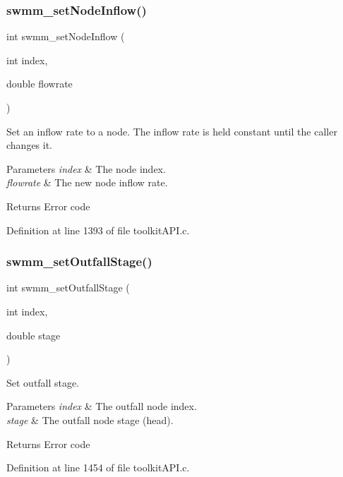\subsubsection{\texorpdfstring{swmm\+\_\+set\+Node\+Inflow()}{swmm\_setNodeInflow()}}
{\footnotesize\ttfamily int swmm\+\_\+set\+Node\+Inflow (\begin{DoxyParamCaption}\item[{int}]{index,  }\item[{double}]{flowrate }\end{DoxyParamCaption})}



Set an inflow rate to a node. The inflow rate is held constant until the caller changes it. 


\begin{DoxyParams}{Parameters}
{\em index} & The node index. \\
\hline
{\em flowrate} & The new node inflow rate. \\
\hline
\end{DoxyParams}
\begin{DoxyReturn}{Returns}
Error code 
\end{DoxyReturn}


Definition at line 1393 of file toolkit\+A\+P\+I.\+c.

\mbox{\label{group__tkfuncs_ga80d902400625073d8ff2c392365fde9b}} 
\subsubsection{\texorpdfstring{swmm\+\_\+set\+Outfall\+Stage()}{swmm\_setOutfallStage()}}
{\footnotesize\ttfamily int swmm\+\_\+set\+Outfall\+Stage (\begin{DoxyParamCaption}\item[{int}]{index,  }\item[{double}]{stage }\end{DoxyParamCaption})}



Set outfall stage. 


\begin{DoxyParams}{Parameters}
{\em index} & The outfall node index. \\
\hline
{\em stage} & The outfall node stage (head). \\
\hline
\end{DoxyParams}
\begin{DoxyReturn}{Returns}
Error code 
\end{DoxyReturn}


Definition at line 1454 of file toolkit\+A\+P\+I.\+c.

